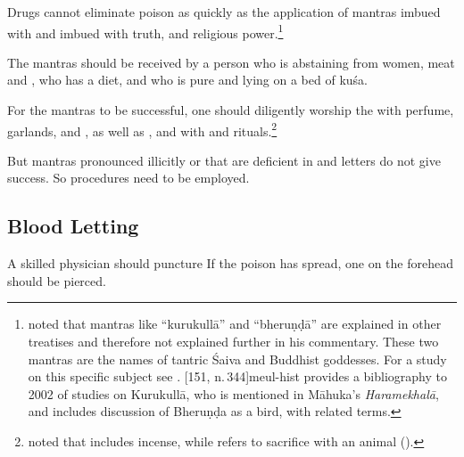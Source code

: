 \begin{translation}
\item [10]

Drugs cannot eliminate poison as quickly as the application of mantras
imbued with  and imbued with truth,
 and religious power.\footnote{
    noted that mantras like “kurukullā” and “bheruṇḍā” are explained in other
    treatises and therefore not explained further in his commentary. These
    two mantras are the names of tantric Śaiva and Buddhist goddesses. For a
    study on this specific subject see \citet{slou-2016b}. [151,
    n.\,344]{meul-hist} provides a bibliography to 2002 of studies on
    Kurukullā, who is mentioned in Māhuka's \emph{Haramekhalā}, and
    \cite[30--34]{meul-2008b} includes discussion of Bheruṇḍa as a bird, with
    related terms.} 

\item [11] 

The mantras should be received by a person who is
abstaining from women, meat and , who has a
 diet, and who is pure and lying on a bed of \gls{kuśa}.

\item [12]

For the mantras to be successful, one should diligently worship the
 with perfume, garlands, and ,
as well as , and with  and rituals.\footnote{ noted that
     includes incense, while  refers to sacrifice
    with an animal ().}


\item [13]

But mantras pronounced illicitly or that are deficient in
 and letters do not give success.  So
 procedures need to be employed.

\subsection{Blood Letting}

\item [14]

A skilled physician should puncture  If the poison has spread, one on the forehead should be
pierced.


\end{translation}
